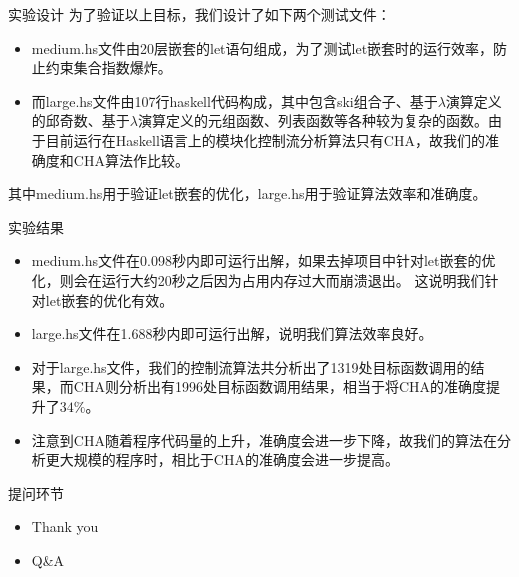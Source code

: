 \documentclass[9pt]{beamer}
\begin{document}
\begin{frame}[fragile]{实验设计}
	为了验证以上目标，我们设计了如下两个测试文件：
	\vspace{0.5em}
	\begin{itemize}
		\item medium.hs文件由20层嵌套的let语句组成，为了测试let嵌套时的运行效率，防止约束集合指数爆炸。
		\vspace{0.3em}
		\item 而large.hs文件由107行haskell代码构成，其中包含ski组合子、基于$\lambda$演算定义的邱奇数、基于$\lambda$演算定义的元组函数、列表函数等各种较为复杂的函数。由于目前运行在Haskell语言上的模块化控制流分析算法只有CHA，故我们的准确度和CHA算法作比较。
	\end{itemize}
	\vspace{0.2em}
	其中medium.hs用于验证let嵌套的优化，large.hs用于验证算法效率和准确度。
\end{frame}

\begin{frame}[fragile]{实验结果}
	\begin{itemize}
		\item medium.hs文件在0.098秒内即可运行出解，如果去掉项目中针对let嵌套的优化，则会在运行大约20秒之后因为占用内存过大而崩溃退出。 这说明我们针对let嵌套的优化有效。
		\vspace{0.2em}
		\item large.hs文件在1.688秒内即可运行出解，说明我们算法效率良好。
		\vspace{0.2em}
		\item 对于large.hs文件，我们的控制流算法共分析出了1319处目标函数调用的结果，而CHA则分析出有1996处目标函数调用结果，相当于将CHA的准确度提升了$34\%$。
		\vspace{0.2em}
		\item 注意到CHA随着程序代码量的上升，准确度会进一步下降，故我们的算法在分析更大规模的程序时，相比于CHA的准确度会进一步提高。
	\end{itemize}
\end{frame}

\begin{frame}[fragile]{提问环节}
	\begin{itemize}
		\item Thank you 
		\vspace{1em}
		\item Q\&A
	\end{itemize}
\end{frame}
\end{document}
